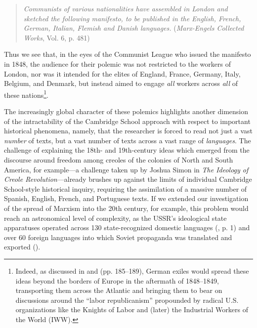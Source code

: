\documentclass[11pt]{article}
\begin{document}
\begin{quote}
	\textit{Communists of various nationalities have assembled in London and sketched the following manifesto, to be published in the English, French, German, Italian, Flemish and Danish languages.} (\textit{Marx-Engels Collected Works}, Vol. 6, p. 481)
\end{quote}

Thus we see that, in the eyes of the Communist League who issued the manifesto in 1848, the audience for their polemic was not restricted to the workers of London, nor was it intended for the elites of England, France, Germany, Italy, Belgium, and Denmark, but instead aimed to engage \textit{all} workers across \textit{all} of these nations\footnote{Indeed, as discussed in \cite{feuer_north_1963} and \cite{gourevitch_slavery_2015} (pp. 185--189), German exiles would spread these ideas beyond the borders of Europe in the aftermath of 1848--1849, transporting them across the Atlantic and bringing them to bear on discussions around the ``labor republicanism'' propounded by radical U.S. organizations like the Knights of Labor and (later) the Industrial Workers of the World (IWW).}.

The increasingly global character of these polemics highlights another dimension of the intractability of the Cambridge School approach with respect to important historical phenomena, namely, that the researcher is forced to read not just a vast \textit{number} of texts, but a vast number of texts across a vast range of \textit{languages}. The challenge of explaining the 18th- and 19th-century ideas which emerged from the discourse around freedom among creoles of the colonies of North and South America, for example---a challenge taken up by Joshua Simon in \textit{The Ideology of Creole Revolution}---already brushes up against the limits of individual Cambridge School-style historical inquiry, requiring the assimilation of a massive number of Spanish, English, French, and Portuguese texts. If we extended our investigation of the spread of Marxism into the 20th century, for example, this problem would reach an astronomical level of complexity, as the USSR's ideological state apparatuses operated across 130 state-recognized domestic languages (\cite{comrie_languages_1981}, p. 1) and over 60 foreign languages into which Soviet propaganda was translated and exported (\cite{jacobs_quantifying_2021}).
\end{document}
